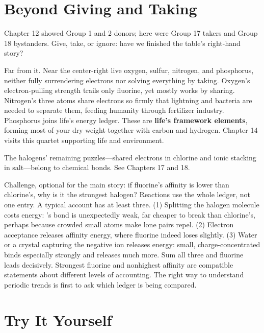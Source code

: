 \section{Beyond Giving and Taking}

Chapter 12 showed Group 1 and 2 donors; here were Group 17 takers and Group 18 bystanders. Give, take, or ignore: have we finished the table's right-hand story?

Far from it. Near the center-right live oxygen, sulfur, nitrogen, and phosphorus, neither fully surrendering electrons nor solving everything by taking. Oxygen's electron-pulling strength trails only fluorine, yet mostly works by sharing. Nitrogen's three atoms share electrons so firmly that lightning and bacteria are needed to separate them, feeding humanity through fertilizer industry. Phosphorus joins life's energy ledger. These are \textbf{life's framework elements}, forming most of your dry weight together with carbon and hydrogen. Chapter 14 visits this quartet supporting life and environment.

The halogens' remaining puzzles---shared electrons in chlorine and ionic stacking in salt---belong to chemical bonds. See Chapters 17 and 18.

\begin{tiaozhan}
Challenge, optional for the main story: if fluorine's affinity is lower than chlorine's, why is it the strongest halogen? Reactions use the whole ledger, not one entry. A typical account has at least three. (1) Splitting the halogen molecule costs energy: 's bond is unexpectedly weak, far cheaper to break than chlorine's, perhaps because crowded small atoms make lone pairs repel. (2) Electron acceptance releases affinity energy, where fluorine indeed loses slightly. (3) Water or a crystal capturing the negative ion releases energy: small, charge-concentrated  binds especially strongly and releases much more. Sum all three and fluorine leads decisively. Strongest fluorine and nonhighest affinity are compatible statements about different levels of accounting. The right way to understand periodic trends is first to ask which ledger is being compared.
\end{tiaozhan}

\section*{Try It Yourself}

